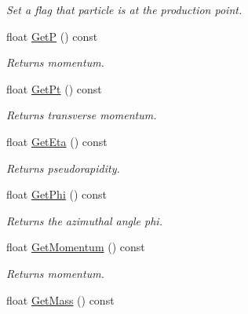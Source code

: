 \begin{DoxyCompactItemize}
\begin{DoxyCompactList}\small\item\em Set a flag that particle is at the production point. \end{DoxyCompactList}\item 
float \hyperlink{classKFParticle_a79dce9fd75bb4fb4aba288ccf6c7eb66}{GetP} () const \hypertarget{classKFParticle_a79dce9fd75bb4fb4aba288ccf6c7eb66}{}\label{classKFParticle_a79dce9fd75bb4fb4aba288ccf6c7eb66}

\begin{DoxyCompactList}\small\item\em Returns momentum. \end{DoxyCompactList}\item 
float \hyperlink{classKFParticle_af84e1b54f8c1c707d5f99b9865843193}{Get\+Pt} () const \hypertarget{classKFParticle_af84e1b54f8c1c707d5f99b9865843193}{}\label{classKFParticle_af84e1b54f8c1c707d5f99b9865843193}

\begin{DoxyCompactList}\small\item\em Returns transverse momentum. \end{DoxyCompactList}\item 
float \hyperlink{classKFParticle_ae01bc73d12e613bc9ad51a378ff0e65a}{Get\+Eta} () const \hypertarget{classKFParticle_ae01bc73d12e613bc9ad51a378ff0e65a}{}\label{classKFParticle_ae01bc73d12e613bc9ad51a378ff0e65a}

\begin{DoxyCompactList}\small\item\em Returns pseudorapidity. \end{DoxyCompactList}\item 
float \hyperlink{classKFParticle_abad00287b0ea28ad7d502d0f2cfd02ca}{Get\+Phi} () const \hypertarget{classKFParticle_abad00287b0ea28ad7d502d0f2cfd02ca}{}\label{classKFParticle_abad00287b0ea28ad7d502d0f2cfd02ca}

\begin{DoxyCompactList}\small\item\em Returns the azimuthal angle phi. \end{DoxyCompactList}\item 
float \hyperlink{classKFParticle_a9b26df4f50340bd40cfd3f3fab0aee11}{Get\+Momentum} () const \hypertarget{classKFParticle_a9b26df4f50340bd40cfd3f3fab0aee11}{}\label{classKFParticle_a9b26df4f50340bd40cfd3f3fab0aee11}

\begin{DoxyCompactList}\small\item\em Returns momentum. \end{DoxyCompactList}\item 
float \hyperlink{classKFParticle_a373770508aea8198a204ae52071c3269}{Get\+Mass} () const \hypertarget{classKFParticle_a373770508aea8198a204ae52071c3269}{}\label{classKFParticle_a373770508aea8198a204ae52071c3269}


\end{DoxyCompactItemize}
